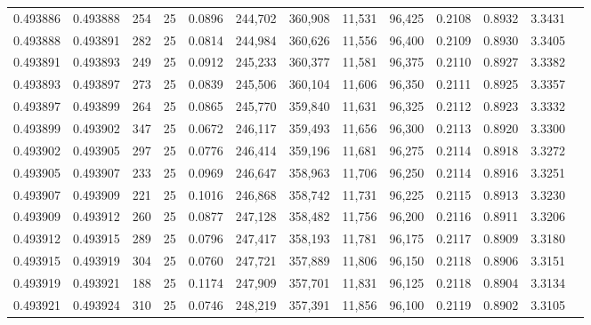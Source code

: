 \begin{tabular}{rrrrrrrrrrrrr}
0.493886 & 0.493888 &   254 &  25 &                                     0.0896 & 244,702 & 360,908 &  11,531 &  96,425 & 0.2108 & 0.8932 & 3.3431 \\
0.493888 & 0.493891 &   282 &  25 &                                     0.0814 & 244,984 & 360,626 &  11,556 &  96,400 & 0.2109 & 0.8930 & 3.3405 \\
0.493891 & 0.493893 &   249 &  25 &                                     0.0912 & 245,233 & 360,377 &  11,581 &  96,375 & 0.2110 & 0.8927 & 3.3382 \\
0.493893 & 0.493897 &   273 &  25 &                                     0.0839 & 245,506 & 360,104 &  11,606 &  96,350 & 0.2111 & 0.8925 & 3.3357 \\
0.493897 & 0.493899 &   264 &  25 &                                     0.0865 & 245,770 & 359,840 &  11,631 &  96,325 & 0.2112 & 0.8923 & 3.3332 \\
0.493899 & 0.493902 &   347 &  25 &                                     0.0672 & 246,117 & 359,493 &  11,656 &  96,300 & 0.2113 & 0.8920 & 3.3300 \\
0.493902 & 0.493905 &   297 &  25 &                                     0.0776 & 246,414 & 359,196 &  11,681 &  96,275 & 0.2114 & 0.8918 & 3.3272 \\
0.493905 & 0.493907 &   233 &  25 &                                     0.0969 & 246,647 & 358,963 &  11,706 &  96,250 & 0.2114 & 0.8916 & 3.3251 \\
0.493907 & 0.493909 &   221 &  25 &                                     0.1016 & 246,868 & 358,742 &  11,731 &  96,225 & 0.2115 & 0.8913 & 3.3230 \\
0.493909 & 0.493912 &   260 &  25 &                                     0.0877 & 247,128 & 358,482 &  11,756 &  96,200 & 0.2116 & 0.8911 & 3.3206 \\
0.493912 & 0.493915 &   289 &  25 &                                     0.0796 & 247,417 & 358,193 &  11,781 &  96,175 & 0.2117 & 0.8909 & 3.3180 \\
0.493915 & 0.493919 &   304 &  25 &                                     0.0760 & 247,721 & 357,889 &  11,806 &  96,150 & 0.2118 & 0.8906 & 3.3151 \\
0.493919 & 0.493921 &   188 &  25 &                                     0.1174 & 247,909 & 357,701 &  11,831 &  96,125 & 0.2118 & 0.8904 & 3.3134 \\
0.493921 & 0.493924 &   310 &  25 &                                     0.0746 & 248,219 & 357,391 &  11,856 &  96,100 & 0.2119 & 0.8902 & 3.3105 \\

\end{tabular}
